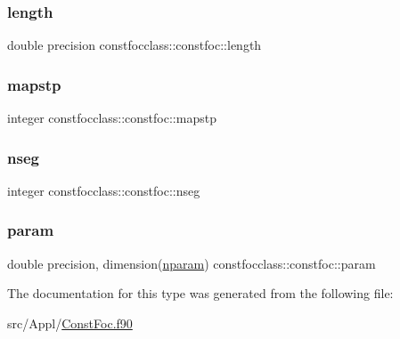 \subsubsection{\texorpdfstring{length}{length}}
{\footnotesize\ttfamily double precision constfocclass\+::constfoc\+::length}

\mbox{\label{structconstfocclass_1_1constfoc_a7211bb49a75643cd5898f13851eb852e}} 
\subsubsection{\texorpdfstring{mapstp}{mapstp}}
{\footnotesize\ttfamily integer constfocclass\+::constfoc\+::mapstp}

\mbox{\label{structconstfocclass_1_1constfoc_ad5d129a88d9e84629813d001b6379bf5}} 
\subsubsection{\texorpdfstring{nseg}{nseg}}
{\footnotesize\ttfamily integer constfocclass\+::constfoc\+::nseg}

\mbox{\label{structconstfocclass_1_1constfoc_a91cddf45b9010e35e24ae6cd063a9ee7}} 
\subsubsection{\texorpdfstring{param}{param}}
{\footnotesize\ttfamily double precision, dimension(\mbox{\hyperlink{namespaceconstfocclass_a4a04b85ebc26340b40e7c38cfad62bc1}{nparam}}) constfocclass\+::constfoc\+::param}



The documentation for this type was generated from the following file\+:\begin{DoxyCompactItemize}
\item 
src/\+Appl/\mbox{\hyperlink{_const_foc_8f90}{Const\+Foc.\+f90}}\end{DoxyCompactItemize}
